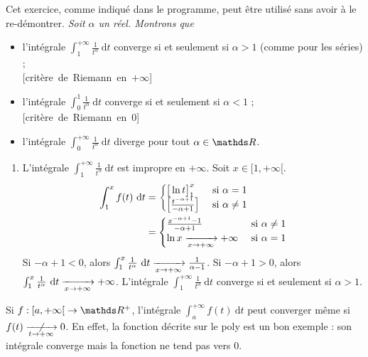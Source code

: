 \begin{exo}
	Cet exercice, comme indiqué dans le programme, peut être utilisé sans avoir à le re-démontrer.
	\slshape
	Soit $\alpha$\/ un réel. Montrons que
	\begin{itemize}
		\item l'intégrale $\int_{1}^{+\infty} \frac{1}{t^\alpha}~\mathrm{d}t$\/ converge si et seulement si $\alpha > 1$\/ (comme pour les séries) ;\\\null\hfill \hbox{[critère de {\sc Riemann}\/ en $+\infty$]}
		\item l'intégrale $\int_{0}^{1} \frac{1}{t^\alpha}~\mathrm{d}t$\/ converge si et seulement si $\alpha < 1$\/ ; \hfill\hbox{[critère de {\sc Riemann}\/ en 0]}
		\item l'intégrale $\int_{0}^{+\infty} \frac{1}{t^\alpha}~\mathrm{d}t$\/ diverge pour tout $\alpha \in \R$.
	\end{itemize}
	\upshape

	\begin{enumerate}
		\item L'intégrale $\int_{1}^{+\infty} \frac{1}{t^\alpha}~\mathrm{d}t$\/ est impropre en $+\infty$. Soit $x \in [1, +\infty[$.
			\begin{align*}
				\int_{1}^{x} f(t)~\mathrm{d}t &= \begin{cases}
				\big[\ln t\big]_1^x& \text{ si } \alpha  = 1\\
				\left[ \frac{t^{-\alpha+1}}{-\alpha + 1} \right] &\text{ si } \alpha \neq 1
				\end{cases}\\
				&= \begin{cases}
					\frac{x^{-\alpha + 1} - 1}{-\alpha + 1} &\text{ si } \alpha \neq 1\\
					\ln x \xrightarrow[x\to+\infty]{} +\infty &\text{ si } \alpha = 1
				\end{cases} \\
			\end{align*}
			Si $-\alpha + 1 < 0$, alors $\int_{1}^{x} \frac{1}{t^\alpha}~\mathrm{d}t \xrightarrow[x\to +\infty]{} \frac{1}{\alpha - 1}$.
			Si $-\alpha + 1 > 0$, alors $\int_{1}^{x} \frac{1}{t^\alpha}~\mathrm{d}t \xrightarrow[x\to +\infty]{} +\infty$.
			L'intégrale $\int_{1}^{+\infty} \frac{1}{t^\alpha}~\mathrm{d}t$\/ converge si et seulement si $\alpha > 1$.
	\end{enumerate}
\end{exo}

\begin{rmk}
	Si $f : {[a, +\infty[}\to \R^+$, l'intégrale $\int_{a}^{+\infty} f(t)~\mathrm{d}t$\/ peut converger même si $f(t) \centernot{\tendsto{t\to +\infty}} 0$. En effet, la fonction décrite sur le poly est un bon exemple : son intégrale converge mais la fonction ne tend pas vers 0.
\end{rmk}

